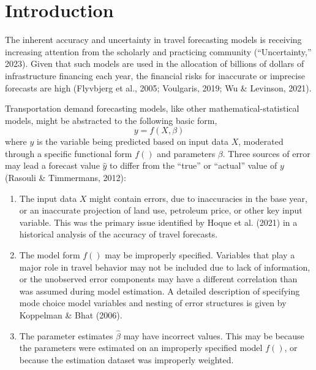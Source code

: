 \documentclass[fancy, masters,twoside]{byuthesis}
\begin{document}
	\tableofcontents*
	\cleardoublepage

	\listoffigures
	\cleardoublepage

	\listoftables
	\cleardoublepage

	
	\cleardoublepage

	\mainmatter

\hypertarget{introduction}{%
\chapter{Introduction}\label{introduction}}

The inherent accuracy and uncertainty in travel forecasting models is receiving increasing attention from the scholarly and practicing community ({``Uncertainty,''} 2023). Given that such models are used in the allocation of billions of dollars of infrastructure financing each year, the financial risks for inaccurate or imprecise forecasts are high (Flyvbjerg et al., 2005; Voulgaris, 2019; Wu \& Levinson, 2021).

Transportation demand forecasting models, like other mathematical-statistical models, might be abstracted to the following basic form,
\begin{equation}
y = f(X, \beta)
\end{equation}
where \(y\) is the variable being predicted based on input data \(X\), moderated through a specific functional form \(f()\) and parameters \(\beta\). Three sources of error may lead a forecast value \(\hat{y}\) to differ from the ``true'' or ``actual'' value of \(y\) (Rasouli \& Timmermans, 2012):

\begin{enumerate}
\def\labelenumi{\arabic{enumi}.}
\item
  The input data \(X\) might contain errors, due to inaccuracies in the base year, or an inaccurate projection of land use, petroleum price, or other key input variable. This was the primary issue identified by Hoque et al. (2021) in a historical analysis of the accuracy of travel forecasts.
\item
  The model form \(f()\) may be improperly specified. Variables that play a major role in travel behavior may not be included due to lack of information, or the unobserved error components may have a different correlation than was assumed during model estimation. A detailed description of specifying mode choice model variables and nesting of error structures is given by Koppelman \& Bhat (2006).
\item
  The parameter estimates \(\hat{\beta}\) may have incorrect values. This may be because the parameters were estimated on an improperly specified model \(f()\), or because the estimation dataset was improperly weighted.
\end{enumerate}
\end{document}

